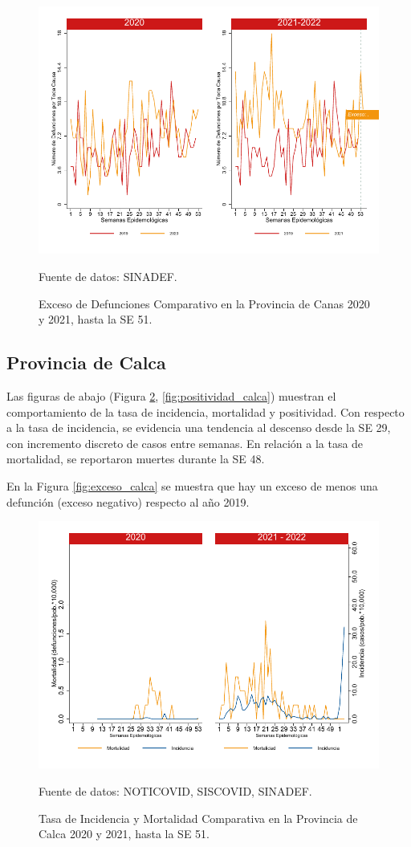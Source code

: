 \documentclass[12pt,a4paper,openany]{book}
\begin{document}
		\begin{figure}[h]
			\caption{Exceso de Defunciones Comparativo en la Provincia de Canas 2020 y 2021, hasta la SE 51.}\label{fig:exceso_canas}
			\begin{center}
				\includegraphics[width=0.7\linewidth]{../figuras/exceso_3}
			\end{center}
			{\footnotesize {Fuente de datos: SINADEF.}}
		\end{figure}
		
		\clearpage
		
		\subsection*{Provincia de Calca}
		\noindent Las figuras de abajo (Figura \ref{fig:inc_mort_calca}, \ref{fig:positividad_calca}) muestran el comportamiento de la tasa de incidencia, mortalidad y  positividad. Con respecto a la tasa de incidencia, se evidencia una tendencia al descenso desde la SE 29, con incremento discreto de casos entre semanas. En relación a la tasa de mortalidad, se reportaron muertes durante la SE 48.
		
		En la Figura \ref{fig:exceso_calca} se muestra que hay un exceso de menos una defunción (exceso negativo) respecto al año 2019.
		
		\begin{figure}[h]
			\caption{Tasa de Incidencia y Mortalidad Comparativa en la Provincia de Calca 2020 y 2021, hasta la SE 51.}\label{fig:inc_mort_calca}
			\begin{center}
				\includegraphics[width=0.7\linewidth]{../figuras/incidencia_mortalidad_20_21_4}
			\end{center}
			{\footnotesize {Fuente de datos: NOTICOVID, SISCOVID, SINADEF.}}
		\end{figure}
		
\end{document}
